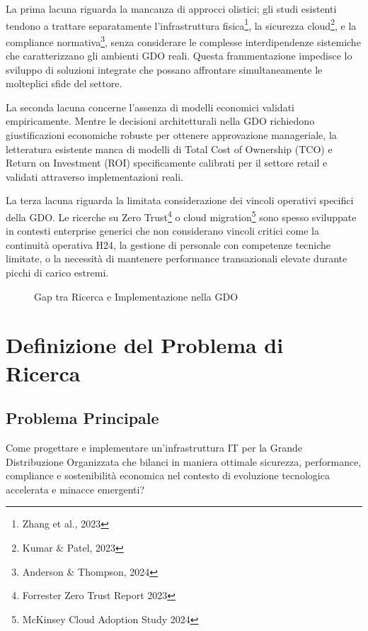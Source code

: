 La prima lacuna riguarda la mancanza di approcci olistici; gli studi esistenti tendono a trattare separatamente l'infrastruttura fisica\footnote{Zhang et al., 2023}, la sicurezza cloud\footnote{Kumar \& Patel, 2023}, e la compliance normativa\footnote{Anderson \& Thompson, 2024}, senza considerare le complesse interdipendenze sistemiche che caratterizzano gli ambienti GDO reali. Questa frammentazione impedisce lo sviluppo di soluzioni integrate che possano affrontare simultaneamente le molteplici sfide del settore.

La seconda lacuna concerne l'assenza di modelli economici validati empiricamente. Mentre le decisioni architetturali nella GDO richiedono giustificazioni economiche robuste per ottenere approvazione manageriale, la letteratura esistente manca di modelli di Total Cost of Ownership (TCO) e Return on Investment (ROI) specificamente calibrati per il settore retail e validati attraverso implementazioni reali.

La terza lacuna riguarda la limitata considerazione dei vincoli operativi specifici della GDO. Le ricerche su Zero Trust\footnote{Forrester Zero Trust Report 2023} o cloud migration\footnote{McKinsey Cloud Adoption Study 2024} sono spesso sviluppate in contesti enterprise generici che non considerano vincoli critici come la continuità operativa H24, la gestione di personale con competenze tecniche limitate, o la necessità di mantenere performance transazionali elevate durante picchi di carico estremi.

\begin{figure}[H]
\centering
{}
\caption{Gap tra Ricerca e Implementazione nella GDO}
\end{figure}

\section{Definizione del Problema di Ricerca}

\subsection{Problema Principale}

Come progettare e implementare un'infrastruttura IT per la Grande Distribuzione Organizzata che bilanci in maniera ottimale sicurezza, performance, compliance e sostenibilità economica nel contesto di evoluzione tecnologica accelerata e minacce emergenti?

